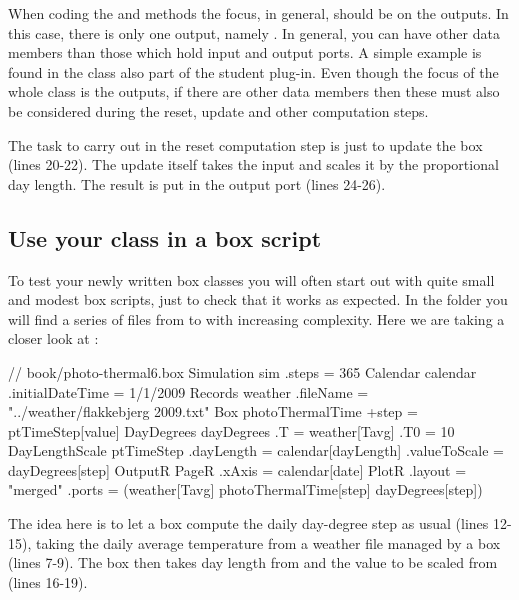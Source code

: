 When coding the  and  methods the focus, in general, should be on the outputs. In this case, there is only one output, namely . In general, you can have other data members than those which hold input and output ports. A simple example is found in the  class also part of the student plug-in. Even though the focus of the whole class is the outputs, if there are other data members then these must also be considered during the reset, update and other computation steps.

The task to carry out in the reset computation step is just to update the box (lines 20-22). The update itself takes the  input and scales it by the proportional day length. The result is put in the  output port (lines 24-26).

\subsection{Use your class in a box script}
To test your newly written box classes you will often start out with quite small and modest box scripts, just to check that it works as expected. In the  folder you will find a series of files from  to  with increasing complexity. Here we are taking a closer look at :
\lstset{numbers=left}
\begin{boxscript}
// book/photo-thermal6.box
Simulation sim {
  .steps = 365
  Calendar calendar {
    .initialDateTime = 1/1/2009
  }
  Records weather {
    .fileName = "../weather/flakkebjerg 2009.txt"
  }
  Box photoThermalTime {
    +step = ptTimeStep[value]
    DayDegrees dayDegrees {
      .T = weather[Tavg]
      .T0 = 10
    }
    DayLengthScale ptTimeStep {
      .dayLength = calendar[dayLength]
      .valueToScale = dayDegrees[step]
    }
  }
  OutputR {
    PageR {
      .xAxis = calendar[date]
      PlotR {
        .layout = "merged"
        .ports = (weather[Tavg] photoThermalTime[step] 
                  dayDegrees[step])
      }
    }
  }
}\end{boxscript}
\lstset{numbers=none}

The idea here is to let a  box compute the daily day-degree step as usual (lines 12-15), taking the daily average temperature from a weather file managed by a  box (lines 7-9). The  box then takes day length from  and the value to be scaled from  (lines 16-19). 

